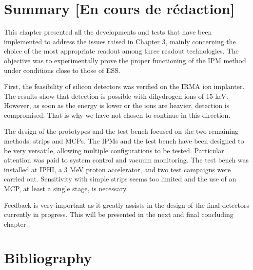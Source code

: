 \begin{refsection}
  \section{Summary [En cours de rédaction]}
  \label{ch4:Summary}
  This chapter presented all the developments and tests that have been implemented to address the issues raised in Chapter 3, mainly concerning the choice of the most appropriate readout among three readout technologies. The objective was to experimentally prove the proper functioning of the IPM method under conditions close to those of ESS.

  First, the feasibility of silicon detectors was verified on the IRMA ion implanter. The results show that detection is possible with dihydrogen ions of 15 keV. However, as soon as the energy is lower or the ions are heavier, detection is compromised. That is why we have not chosen to continue in this direction.
  
  The design of the prototypes and the test bench focused on the two remaining methods: strips and MCPs. The IPMs and the test bench have been designed to be very versatile, allowing multiple configurations to be tested. Particular attention was paid to system control and vacuum monitoring. The test bench was installed at IPHI, a 3 MeV proton accelerator, and two test campaigns were carried out.
  Sensitivity with simple strips seems too limited and the use of an MCP, at least a single stage, is necessary.
  
  Feedback is very important as it greatly assists in the design of the final detectors currently in progress. This will be presented in the next and final concluding chapter.
  \cleardoublepage
  \section{Bibliography}
  \label{ch4:bib}
  \printbibliography[heading=subbibliography]

\end{refsection}
